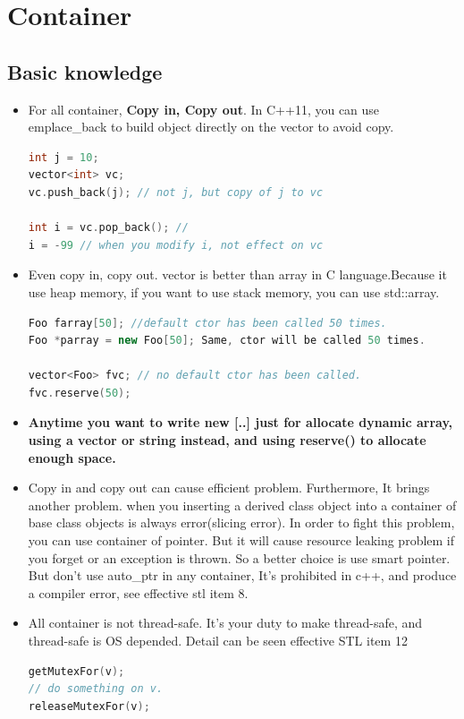 \documentclass[a4paper,11pt,twoside]{book}
\begin{document}
\section{Container}

\subsection{Basic knowledge}
\begin{itemize}

\item For all container, \textbf{Copy in, Copy out}. In C++11, you can use emplace\_back to build object directly on the vector to avoid copy.
\begin{lstlisting}[frame=single, language=c++]
int j = 10;
vector<int> vc;
vc.push_back(j); // not j, but copy of j to vc

int i = vc.pop_back(); //
i = -99 // when you modify i, not effect on vc
\end{lstlisting}

\item Even copy in, copy out. vector is better than array in C language.Because it use heap memory, if you want to use stack memory, you can use std::array.
\begin{lstlisting}[frame=single, language=c++]
Foo farray[50]; //default ctor has been called 50 times.
Foo *parray = new Foo[50]; Same, ctor will be called 50 times.

vector<Foo> fvc; // no default ctor has been called.
fvc.reserve(50);
\end{lstlisting}

\item \textbf{Anytime you want to write new [..] just for allocate dynamic array, using a vector or string instead, and using reserve() to allocate enough space.}


\item Copy in and copy out can cause efficient problem. Furthermore, It brings  another problem. when you inserting a derived class object into a container of base class objects is always error(slicing error). In order to fight this problem, you can use container of pointer. But it will cause resource leaking problem if you forget or an exception is thrown. So a better choice is use smart pointer. But don't use auto\_ptr in any container, It's prohibited in c++, and produce a compiler error, see effective stl item 8.

\item All container is not thread-safe. It's your duty to make thread-safe, and thread-safe is OS depended. Detail can be seen effective STL item 12
\begin{lstlisting}[frame=single, language=c++]
getMutexFor(v);
// do something on v.
releaseMutexFor(v);
\end{lstlisting}


\end{itemize}
\end{document}

